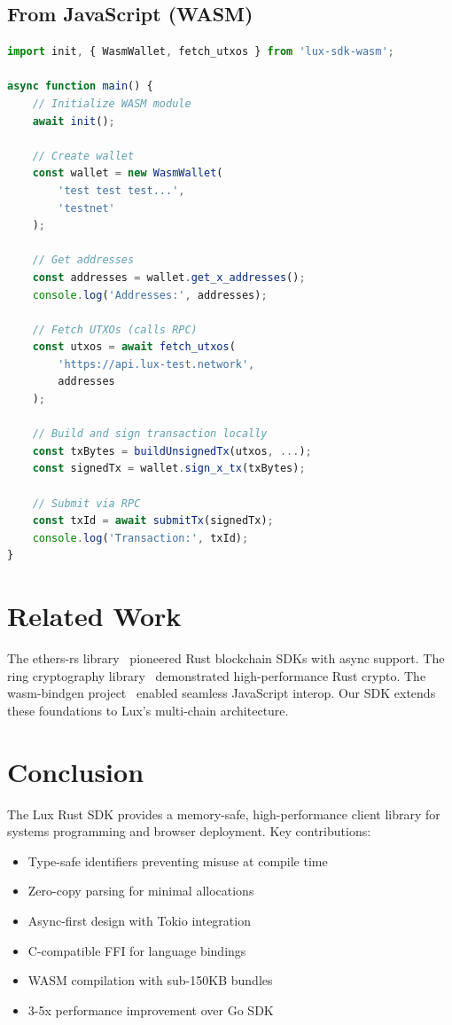 \documentclass[11pt,twocolumn]{article}
\begin{document}
\subsection{From JavaScript (WASM)}

\begin{lstlisting}[language=JavaScript,caption=WASM Usage]
import init, { WasmWallet, fetch_utxos } from 'lux-sdk-wasm';

async function main() {
    // Initialize WASM module
    await init();

    // Create wallet
    const wallet = new WasmWallet(
        'test test test...',
        'testnet'
    );

    // Get addresses
    const addresses = wallet.get_x_addresses();
    console.log('Addresses:', addresses);

    // Fetch UTXOs (calls RPC)
    const utxos = await fetch_utxos(
        'https://api.lux-test.network',
        addresses
    );

    // Build and sign transaction locally
    const txBytes = buildUnsignedTx(utxos, ...);
    const signedTx = wallet.sign_x_tx(txBytes);

    // Submit via RPC
    const txId = await submitTx(signedTx);
    console.log('Transaction:', txId);
}
\end{lstlisting}

\section{Related Work}

The ethers-rs library~\cite{ethersrs} pioneered Rust blockchain SDKs with async support. The ring cryptography library~\cite{ring} demonstrated high-performance Rust crypto. The wasm-bindgen project~\cite{wasmbindgen} enabled seamless JavaScript interop. Our SDK extends these foundations to Lux's multi-chain architecture.

\section{Conclusion}

The Lux Rust SDK provides a memory-safe, high-performance client library for systems programming and browser deployment. Key contributions:

\begin{itemize}
    \item Type-safe identifiers preventing misuse at compile time
    \item Zero-copy parsing for minimal allocations
    \item Async-first design with Tokio integration
    \item C-compatible FFI for language bindings
    \item WASM compilation with sub-150KB bundles
    \item 3-5x performance improvement over Go SDK
\end{itemize}
\end{document}
